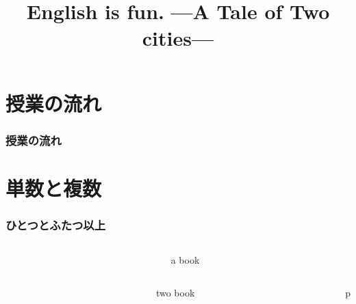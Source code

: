 \documentclass[aspectratio=169]{beamer}
\title{English is fun.\,\,{}---A Tale of Two cities---}
\author{}
\institute[]{}
\date[]
\begin{document}
\begin{frame}[plain]
  \titlepage
\end{frame}

\section*{授業の流れ}
\begin{frame}[plain]
  \frametitle{授業の流れ}
  \tableofcontents
\end{frame}

\section{単数と複数}

\begin{frame}[plain]\frametitle{ひとつとふたつ以上}
\begin{columns}
\begin{column}{.25\textwidth}
\end{column}\pause
\begin{column}{.5\textwidth}\LARGE
a book
\end{column}
\end{columns}

\pause
\begin{columns}
\begin{column}{.25\textwidth}
\end{column}\pause
\begin{column}{.5\textwidth}\LARGE
two book
\end{column}
p
\end{columns}
\end{frame}
\end{document}
